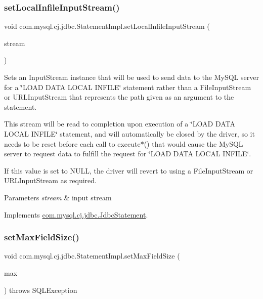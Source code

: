 \subsubsection{\texorpdfstring{set\+Local\+Infile\+Input\+Stream()}{setLocalInfileInputStream()}}
{\footnotesize\ttfamily void com.\+mysql.\+cj.\+jdbc.\+Statement\+Impl.\+set\+Local\+Infile\+Input\+Stream (\begin{DoxyParamCaption}\item[{Input\+Stream}]{stream }\end{DoxyParamCaption})}

Sets an Input\+Stream instance that will be used to send data to the My\+S\+QL server for a \char`\"{}\+L\+O\+A\+D D\+A\+T\+A L\+O\+C\+A\+L I\+N\+F\+I\+L\+E\char`\"{} statement rather than a File\+Input\+Stream or U\+R\+L\+Input\+Stream that represents the path given as an argument to the statement.

This stream will be read to completion upon execution of a \char`\"{}\+L\+O\+A\+D D\+A\+T\+A L\+O\+C\+A\+L I\+N\+F\+I\+L\+E\char`\"{} statement, and will automatically be closed by the driver, so it needs to be reset before each call to execute$\ast$() that would cause the My\+S\+QL server to request data to fulfill the request for \char`\"{}\+L\+O\+A\+D D\+A\+T\+A L\+O\+C\+A\+L I\+N\+F\+I\+L\+E\char`\"{}.

If this value is set to N\+U\+LL, the driver will revert to using a File\+Input\+Stream or U\+R\+L\+Input\+Stream as required.


\begin{DoxyParams}{Parameters}
{\em stream} & input stream \\
\hline
\end{DoxyParams}


Implements \mbox{\hyperlink{interfacecom_1_1mysql_1_1cj_1_1jdbc_1_1_jdbc_statement_a89093285d02aa790bb07c7afab7c4140}{com.\+mysql.\+cj.\+jdbc.\+Jdbc\+Statement}}.

\mbox{\label{classcom_1_1mysql_1_1cj_1_1jdbc_1_1_statement_impl_ab0013f973a2fe60cb9cdbfa6f53486e6}} 
\subsubsection{\texorpdfstring{set\+Max\+Field\+Size()}{setMaxFieldSize()}}
{\footnotesize\ttfamily void com.\+mysql.\+cj.\+jdbc.\+Statement\+Impl.\+set\+Max\+Field\+Size (\begin{DoxyParamCaption}\item[{int}]{max }\end{DoxyParamCaption}) throws S\+Q\+L\+Exception}

